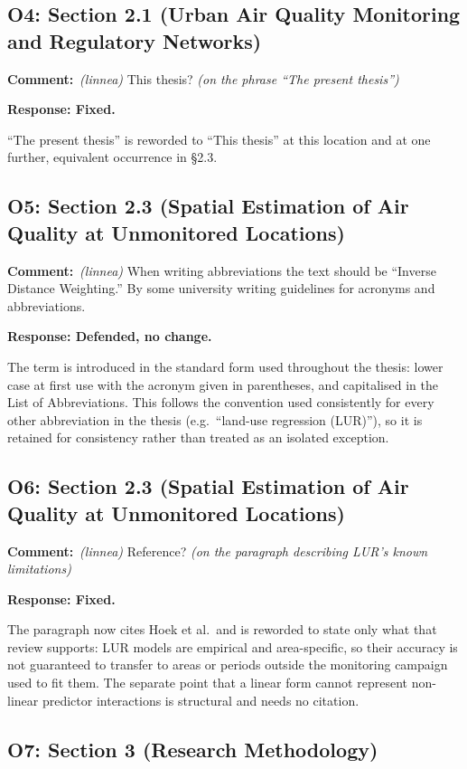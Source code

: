 \documentclass[11pt,a4paper]{article}
\newcommand{\rjcomment}[1]{\par\noindent\textbf{Comment:}\ #1\par}
\newcommand{\rjresponse}[1]{\par\noindent\textbf{Response: #1}\par}
\begin{document}
\subsection{O4: Section 2.1 (Urban Air Quality Monitoring and Regulatory Networks)}

\rjcomment{\emph{(linnea)} This thesis? \emph{(on the phrase ``The present thesis'')}}

\rjresponse{Fixed.}
``The present thesis'' is reworded to ``This thesis'' at this location and at one further,
equivalent occurrence in \S2.3.

\subsection{O5: Section 2.3 (Spatial Estimation of Air Quality at Unmonitored Locations)}

\rjcomment{\emph{(linnea)} When writing abbreviations the text should be ``Inverse Distance
Weighting.'' By some university writing guidelines for acronyms and abbreviations.}

\rjresponse{Defended, no change.}
The term is introduced in the standard form used throughout the thesis: lower case at first use
with the acronym given in parentheses, and capitalised in the List of Abbreviations. This
follows the convention used consistently for every other abbreviation in the thesis (e.g.\
``land-use regression (LUR)''), so it is retained for consistency rather than treated as an
isolated exception.

\subsection{O6: Section 2.3 (Spatial Estimation of Air Quality at Unmonitored Locations)}

\rjcomment{\emph{(linnea)} Reference? \emph{(on the paragraph describing LUR's known
limitations)}}

\rjresponse{Fixed.}
The paragraph now cites Hoek et al.\ and is reworded to state only what that review supports:
LUR models are empirical and area-specific, so their accuracy is not guaranteed to transfer to
areas or periods outside the monitoring campaign used to fit them. The separate point that a
linear form cannot represent non-linear predictor interactions is structural and needs no
citation.

\subsection{O7: Section 3 (Research Methodology)}
\end{document}
